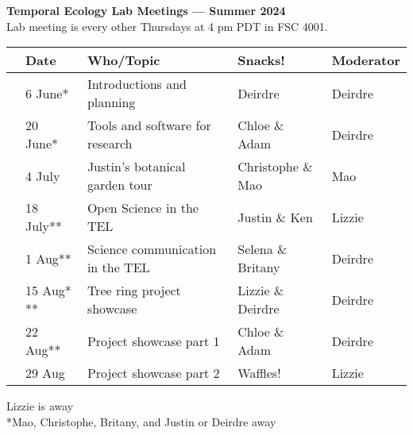 \documentclass[11pt]{article}
\begin{document}
 
\raggedright
{}

\begin{center} 
{\large \textbf{Temporal Ecology Lab Meetings --- Summer 2024}} \\ [2pt]
Lab meeting is every other Thursdays at 4 pm PDT in FSC 4001.\\ %
\end{center} 

\begin{center}
\begin{tabular}{ p{0.2 cm}  p{2 cm}  p{5 cm}  p{3 cm}  p{3 cm} }  \hline \hline
 & \textbf{Date}
   & \textbf{Who/Topic}
      & \textbf{Snacks!} 
         & \textbf{Moderator} \\ 
\hline \hline
& 6 June* & Introductions and planning  &   Deirdre    & Deirdre\\\hline
& 20 June* &  Tools and software for research &  Chloe \& Adam &  Deirdre \\\hline
& 4 July &  Justin's botanical garden tour & Christophe \& Mao &  Mao\\\hline  
& 18 July** &  Open Science in the TEL &  Justin \&  Ken &  Lizzie \\\hline
& 1 Aug**  & Science communication in the TEL &  Selena \& Britany &  Deirdre \\\hline 
& 15 Aug* ** &   Tree ring project showcase & Lizzie \& Deirdre &  Deirdre\\\hline
& 22 Aug** &   Project showcase part 1 & Chloe \& Adam &  Deirdre \\\hline
& 29 Aug &  Project showcase part 2 & Waffles! & Lizzie\\\hline 
\hline
\end{tabular}
\end{center}
\noindent *Lizzie is away \\
\noindent **Mao, Christophe, Britany, and Justin or Deirdre away
\end{document}
